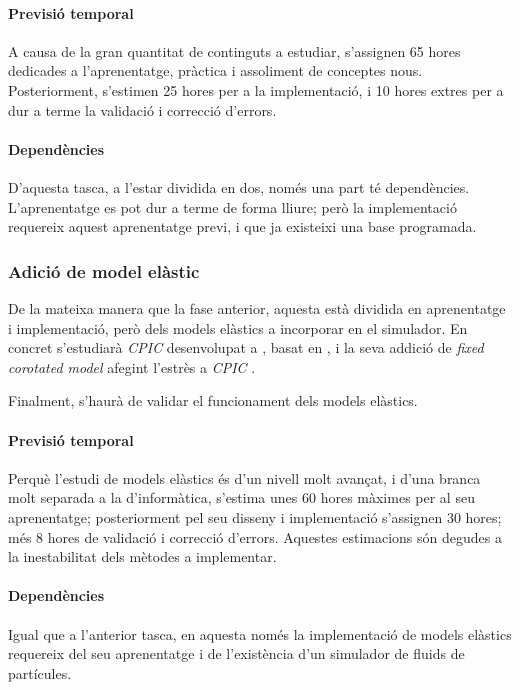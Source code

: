 \documentclass[a4paper]{report}
\begin{document}
	\paragraph{\quad Previsió temporal} A causa de la gran quantitat de continguts a estudiar, s'assignen 65 hores dedicades a l'aprenentatge, pràctica i assoliment de conceptes nous. Posteriorment, s'estimen 25 hores per a la implementació, i 10 hores extres per a dur a terme la validació i correcció d'errors.
	\paragraph{\quad Dependències} D'aquesta tasca, a l'estar dividida en dos, només una part té dependències. L'aprenentatge es pot dur a terme de forma lliure; però la implementació requereix aquest aprenentatge previ, i que ja existeixi una base programada.
	
	\subsubsection{Adició de model elàstic}
	De la mateixa manera que la fase anterior, aquesta està dividida en aprenentatge i implementació, però dels models elàstics a incorporar en el simulador. En concret s'estudiarà \textit{CPIC} desenvolupat a \cite{hu2018mlsmpmcpic}, basat en \cite{Jiang2016}, i la seva addició de \textit{fixed corotated model} afegint l'estrès a \textit{CPIC} \cite{Hu,Jiang2016}. \par
	Finalment, s'haurà de validar el funcionament dels models elàstics.
	\paragraph{\quad Previsió temporal} Perquè l'estudi de models elàstics és d'un nivell molt avançat, i d'una branca molt separada a la d'informàtica, s'estima unes 60 hores màximes per al seu aprenentatge; posteriorment pel seu disseny i implementació s'assignen 30 hores; més 8 hores de validació i correcció d'errors. Aquestes estimacions són degudes a la inestabilitat dels mètodes a implementar.
	\paragraph{\quad Dependències} Igual que a l'anterior tasca, en aquesta només la implementació de models elàstics requereix del seu aprenentatge i de l'existència d'un simulador de fluids de partícules.
	
\end{document}
